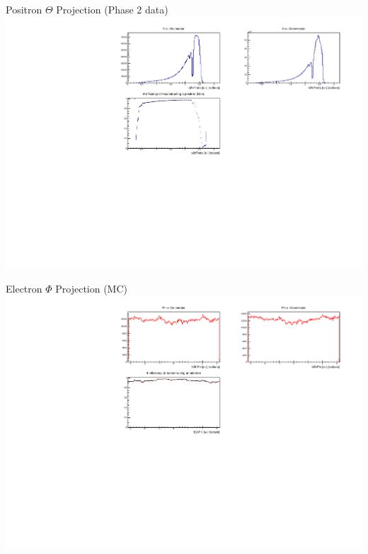 \documentclass[10pt]{beamer}
\begin{document}
\begin{frame}{Positron $\Theta$ Projection (Phase 2 data)}
	\centering
	\includegraphics[width=\textwidth]{Plots/Eff/epThetaPro_Data}
\end{frame}

\begin{frame}{Electron $\Phi$ Projection (MC)}
	\centering
	\includegraphics[width=\textwidth]{Plots/Eff/emPhiPro}
\end{frame}
\end{document}
